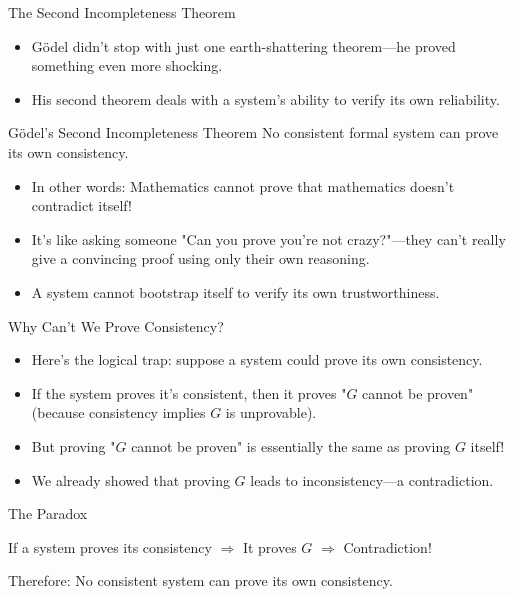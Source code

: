 \documentclass[aspectratio=169]{beamer}
\begin{document}
\begin{frame}{The Second Incompleteness Theorem}

\begin{itemize}
    \item Gödel didn't stop with just one earth-shattering theorem—he proved something even more shocking.
    \item His second theorem deals with a system's ability to verify its own reliability.
\end{itemize}

\begin{alertblock}{Gödel's Second Incompleteness Theorem}
No consistent formal system can prove its own consistency.
\end{alertblock}

\begin{itemize}
    \item In other words: Mathematics cannot prove that mathematics doesn't contradict itself!
    \item It's like asking someone "Can you prove you're not crazy?"—they can't really give a convincing proof using only their own reasoning.
    \item A system cannot bootstrap itself to verify its own trustworthiness.
\end{itemize}

\end{frame}

\begin{frame}{Why Can't We Prove Consistency?}

\begin{itemize}
    \item Here's the logical trap: suppose a system could prove its own consistency.
    \item If the system proves it's consistent, then it proves "$G$ cannot be proven" (because consistency implies $G$ is unprovable).
    \item But proving "$G$ cannot be proven" is essentially the same as proving $G$ itself!
    \item We already showed that proving $G$ leads to inconsistency—a contradiction.
\end{itemize}

\begin{block}{The Paradox}
\begin{center}
If a system proves its consistency $\Rightarrow$ It proves $G$ $\Rightarrow$ Contradiction!

Therefore: No consistent system can prove its own consistency.
\end{center}
\end{block}

\end{frame}
\end{document}
